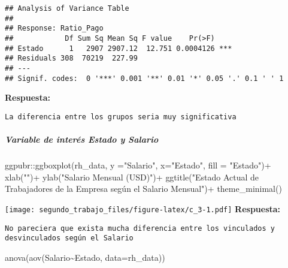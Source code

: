 \documentclass[
]{article}
\newenvironment{Shaded}{\begin{snugshade}}{\end{snugshade}}
\newcommand{\AttributeTok}[1]{\textcolor[rgb]{0.77,0.63,0.00}{#1}}
\newcommand{\FunctionTok}[1]{\textcolor[rgb]{0.00,0.00,0.00}{#1}}
\newcommand{\NormalTok}[1]{#1}
\newcommand{\SpecialCharTok}[1]{\textcolor[rgb]{0.00,0.00,0.00}{#1}}
\newcommand{\StringTok}[1]{\textcolor[rgb]{0.31,0.60,0.02}{#1}}
\begin{document}
\begin{verbatim}
## Analysis of Variance Table
## 
## Response: Ratio_Pago
##            Df Sum Sq Mean Sq F value    Pr(>F)    
## Estado      1   2907 2907.12  12.751 0.0004126 ***
## Residuals 308  70219  227.99                      
## ---
## Signif. codes:  0 '***' 0.001 '**' 0.01 '*' 0.05 '.' 0.1 ' ' 1
\end{verbatim}

\textbf{Respuesta:}

\begin{verbatim}
La diferencia entre los grupos seria muy significativa
\end{verbatim}

\hypertarget{variable-de-interuxe9s-estado-y-salario}{%
\subparagraph{Variable de interés Estado y
Salario}\label{variable-de-interuxe9s-estado-y-salario}}

\begin{Shaded}
\begin{Highlighting}[]
\NormalTok{ggpubr}\SpecialCharTok{::}\FunctionTok{ggboxplot}\NormalTok{(rh\_data, }\AttributeTok{y =}\StringTok{"Salario"}\NormalTok{, }\AttributeTok{x=}\StringTok{"Estado"}\NormalTok{, }\AttributeTok{fill =} \StringTok{"Estado"}\NormalTok{)}\SpecialCharTok{+}  
  \FunctionTok{xlab}\NormalTok{(}\StringTok{""}\NormalTok{)}\SpecialCharTok{+} \FunctionTok{ylab}\NormalTok{(}\StringTok{"Salario Mensual (USD)"}\NormalTok{)}\SpecialCharTok{+}
  \FunctionTok{ggtitle}\NormalTok{(}\StringTok{"Estado Actual de Trabajadores de la Empresa según el Salario Mensual"}\NormalTok{)}\SpecialCharTok{+} \FunctionTok{theme\_minimal}\NormalTok{()}
\end{Highlighting}
\end{Shaded}

\texttt{[image: segundo\_trabajo\_files/figure-latex/c\_3-1.pdf]}
\textbf{Respuesta:}

\begin{verbatim}
No pareciera que exista mucha diferencia entre los vinculados y desvinculados según el Salario
\end{verbatim}

\begin{Shaded}
\begin{Highlighting}[]
\FunctionTok{anova}\NormalTok{(}\FunctionTok{aov}\NormalTok{(Salario}\SpecialCharTok{\textasciitilde{}}\NormalTok{Estado, }\AttributeTok{data=}\NormalTok{rh\_data)) }
\end{Highlighting}
\end{Shaded}
\end{document}
